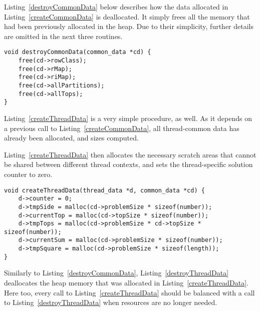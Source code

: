 Listing~\ref{destroyCommonData} below describes how the data allocated in Listing~\ref{createCommonData} is deallocated. It simply frees all the memory that had been previously allocated in the heap. Due to their simplicity, further details are omitted in the next three routines.

\begin{lstlisting}[caption={Deallocating thread-common data.},label={destroyCommonData}]
void destroyCommonData(common_data *cd) {
    free(cd->rowClass);
    free(cd->rMap);
    free(cd->riMap);
    free(cd->allPartitions);
    free(cd->allTops);
}
\end{lstlisting}

Listing~\ref{createThreadData} is a very simple procedure, as well. As it depends on a previous call to Listing~\ref{createCommonData}, all thread-common data has already been allocated, and sizes computed.

\pagebreak

\noindent Listing~\ref{createThreadData} then allocates the necessary scratch areas that cannot be shared between different thread contexts, and sets the thread-specific solution counter to zero.

\begin{lstlisting}[caption={Allocating thread-specific data.},label={createThreadData}]
void createThreadData(thread_data *d, common_data *cd) {
    d->counter = 0;
    d->tmpSide = malloc(cd->problemSize * sizeof(number));
    d->currentTop = malloc(cd->topSize * sizeof(number));
    d->tmpTops = malloc(cd->problemSize * cd->topSize * sizeof(number));
    d->currentSum = malloc(cd->problemSize * sizeof(number));
    d->tmpSquare = malloc(cd->problemSize * sizeof(length));
}
\end{lstlisting}

Similarly to Listing~\ref{destroyCommonData}, Listing~\ref{destroyThreadData} deallocates the heap memory that was allocated in Listing~\ref{createThreadData}. Here too, every call to Listing~\ref{createThreadData} should be balanced with a call to Listing~\ref{destroyThreadData} when resources are no longer needed.

